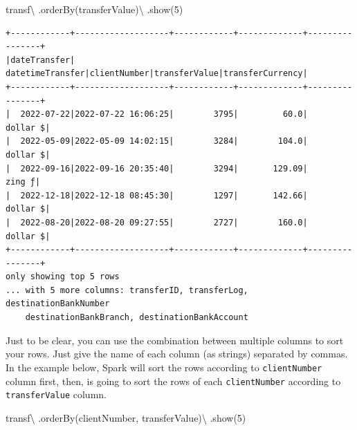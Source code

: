 \documentclass[
  11pt,
  letterpaper,
  DIV=11,
  numbers=noendperiod]{scrreprt}
\newenvironment{Shaded}{\begin{snugshade}}{\end{snugshade}}
\newcommand{\DecValTok}[1]{\textcolor[rgb]{0.68,0.00,0.00}{#1}}
\newcommand{\NormalTok}[1]{\textcolor[rgb]{0.00,0.23,0.31}{#1}}
\newcommand{\OperatorTok}[1]{\textcolor[rgb]{0.37,0.37,0.37}{#1}}
\newcommand{\StringTok}[1]{\textcolor[rgb]{0.13,0.47,0.30}{#1}}
\begin{document}
\begin{Shaded}
\begin{Highlighting}[]
\NormalTok{transf}\OperatorTok{\textbackslash{}}
\NormalTok{  .orderBy(}\StringTok{\textquotesingle{}transferValue\textquotesingle{}}\NormalTok{)}\OperatorTok{\textbackslash{}}
\NormalTok{  .show(}\DecValTok{5}\NormalTok{)}
\end{Highlighting}
\end{Shaded}

\begin{verbatim}
+------------+-------------------+------------+-------------+----------------+
|dateTransfer|   datetimeTransfer|clientNumber|transferValue|transferCurrency|
+------------+-------------------+------------+-------------+----------------+
|  2022-07-22|2022-07-22 16:06:25|        3795|         60.0|        dollar $|
|  2022-05-09|2022-05-09 14:02:15|        3284|        104.0|        dollar $|
|  2022-09-16|2022-09-16 20:35:40|        3294|       129.09|          zing ƒ|
|  2022-12-18|2022-12-18 08:45:30|        1297|       142.66|        dollar $|
|  2022-08-20|2022-08-20 09:27:55|        2727|        160.0|        dollar $|
+------------+-------------------+------------+-------------+----------------+
only showing top 5 rows
... with 5 more columns: transferID, transferLog, destinationBankNumber
    destinationBankBranch, destinationBankAccount
\end{verbatim}

Just to be clear, you can use the combination between multiple columns
to sort your rows. Just give the name of each column (as strings)
separated by commas. In the example below, Spark will sort the rows
according to \texttt{clientNumber} column first, then, is going to sort
the rows of each \texttt{clientNumber} according to
\texttt{transferValue} column.

\begin{Shaded}
\begin{Highlighting}[]
\NormalTok{transf}\OperatorTok{\textbackslash{}}
\NormalTok{  .orderBy(}\StringTok{\textquotesingle{}clientNumber\textquotesingle{}}\NormalTok{, }\StringTok{\textquotesingle{}transferValue\textquotesingle{}}\NormalTok{)}\OperatorTok{\textbackslash{}}
\NormalTok{  .show(}\DecValTok{5}\NormalTok{)}
\end{Highlighting}
\end{Shaded}
\end{document}
